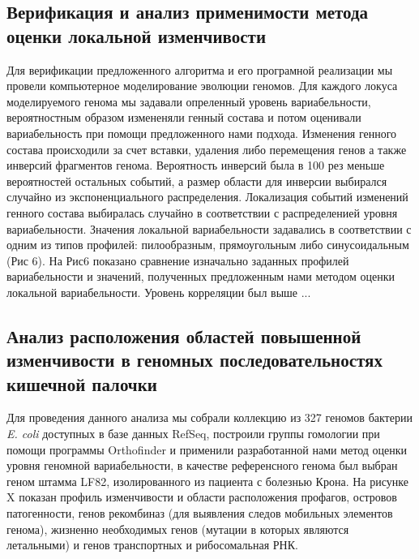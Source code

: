 \subsection*{Верификация и анализ применимости метода оценки локальной изменчивости}
Для верификации предложенного алгоритма и его програмной реализации мы провели компьютерное моделирование эволюции геномов. Для каждого локуса моделируемого генома мы задавали опреленный уровень вариабельности, вероятностным образом измененяли генный состава и потом оценивали вариабельность при помощи предложенного нами подхода. Изменения генного состава происходили за счет вставки, удаления либо перемещения генов а также инверсий фрагментов генома. Вероятность инверсий была в 100 рез меньше вероятностей остальных событий, а размер области для инверсии выбирался случайно из экспоненциального распределения. Локализация событий изменений генного состава выбиралась случайно в соответствии с распределенией уровня вариабельности. Значения локальной вариабельности задавались в соответствии с одним из типов профилей: пилообразным, прямоугольным либо синусоидальным (Рис 6). На Рис6 показано сравнение изначально заданных профилей вариабельности и значений, полученных предложенным нами методом оценки локальной вариабельности. Уровень корреляции был выше ...


\subsection*{Анализ расположения областей повышенной изменчивости в геномных последовательностях кишечной палочки}
Для проведения данного анализа мы собрали коллекцию из 327 геномов бактерии \textit{E. coli} доступных в базе данных RefSeq, построили группы гомологии при помощи программы Orthofinder и применили разработанной нами метод оценки уровня геномной вариабельности, в качестве референсного генома был выбран геном штамма LF82, изолированного из пациента с болезнью Крона. На рисунке X показан профиль изменчивости и области расположения профагов, островов патогенности, генов рекомбиназ (для выявления следов мобильных элементов генома), жизненно необходимых генов (мутации в которых являются летальными) и генов транспортных и рибосомальная РНК.

